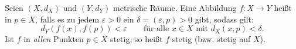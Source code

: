 Seien $(X, d_X)$ und $(Y, d_Y)$ metrische Räume. Eine Abbildung $f: X \to Y$ heißt  in $p \in X$, falls es zu jedem $\varepsilon > 0$ ein $\delta = (\varepsilon, p) > 0$ gibt, sodass gilt: 
$$d_Y(f(x), f(p)) < \varepsilon \qquad \text{für alle $x \in X$ mit $d_X(x, p) < \delta$.}$$
Ist $f$ in \textit{allen} Punkten $p \in X$ stetig, so heißt $f$ stetig (bzw. stetig auf $X$).